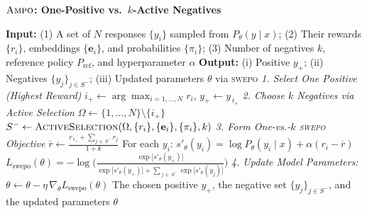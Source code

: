 \begin{algorithm}[t]
\caption{\textcolor{titlecolor}{\textbf{$\textsc{Ampo}$: One-Positive vs.\ $k$-Active Negatives}}}
\label{alg:one_vs_k_active}
\begin{algorithmic}[1]
    \STATE \textcolor{inputcolor}{\textbf{Input:} (1) A set of $N$ responses $\{y_i\}$ sampled from $P_{\theta}(y\mid x)$; (2) Their rewards $\{r_i\}$, embeddings $\{\mathbf{e}_i\}$, and probabilities $\{\pi_i\}$; (3) Number of negatives $k$, reference policy $P_{\mathrm{ref}}$, and hyperparameter $\alpha$}
    \STATE \textcolor{outputcolor}{\textbf{Output:} (i) Positive $y_{+}$; (ii) Negatives $\{y_j\}_{j \in S^-}$; (iii) Updated parameters $\theta$ via \textsc{swepo}}
    \STATE \textcolor{stepcolor}{\textit{1. Select One Positive (Highest Reward)}}
    \STATE \textcolor{mathcolor}{$i_{+} \leftarrow \arg\max_{i=1,\dots,N} r_i$, \quad $y_{+} \leftarrow y_{\,i_{+}}$}
    \STATE \textcolor{stepcolor}{\textit{2. Choose $k$ Negatives via Active Selection}}
    \STATE \textcolor{mathcolor}{$\Omega \leftarrow \{1,\dots,N\}\setminus\{i_{+}\}$}
    \STATE \textcolor{mathcolor}{$S^- \leftarrow \textsc{ActiveSelection}(\Omega,\{r_i\},\{\mathbf{e}_i\},\{\pi_i\},k)$}
    \STATE \textcolor{stepcolor}{\textit{3. Form One-vs.-$k$ \textsc{swepo} Objective}}
    \STATE \textcolor{mathcolor}{$\overline{r} \leftarrow \frac{r_{\,i_{+}} + \sum_{j\,\in\,S^-} r_j}{1 + k}$}
    \STATE For each $y_i$:
    \STATE \textcolor{mathcolor}{$s'_\theta(y_i) = \log P_\theta(y_i \mid x) + \alpha(r_i - \overline{r})$}
    \STATE \textcolor{mathcolor}{$L_{\text{swepo}}(\theta) = -\log\!\Biggl(\frac{\exp\!\bigl[s'_\theta(y_{+})\bigr]}{\exp\!\bigl[s'_\theta(y_{+})\bigr] + \sum_{\,j \,\in\, S^-}\exp\!\bigl[s'_\theta(y_j)\bigr]}\Biggr)$}
    \STATE \textcolor{stepcolor}{\textit{4. Update Model Parameters:}} \textcolor{mathcolor}{$\theta \leftarrow \theta - \eta\,\nabla_\theta L_{\text{swepo}}(\theta)$}
    \RETURN The chosen positive $y_{+}$, the negative set $\{y_j\}_{j \in S^-}$, and the updated parameters $\theta$
\end{algorithmic}
\end{algorithm}

